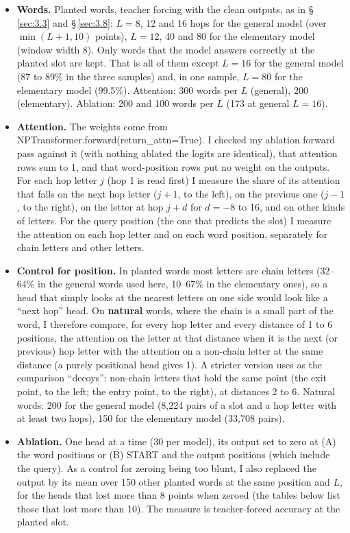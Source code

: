 \documentclass[paper=a4,fontsize=11pt,DIV=11,parskip=half,headings=small,numbers=noendperiod]{scrartcl}
\DeclareRobustCommand{\lead}[1]{\textsf{\bfseries\color{accent}#1}}
\DeclareRobustCommand{\code}[1]{{\fontseries{m}\ttfamily #1}}
\begin{document}
\begin{itemize}
\item \lead{Words.} Planted words, teacher forcing with the clean outputs, as in \S\,\ref{sec:3.3} and
  \S\,\ref{sec:3.8}: $L=8$, 12 and 16 hops for the general model (over $\min(L+1,10)$ points), $L=12$, 40 and 80
  for the elementary model (window width 8). Only words that the model answers correctly at the planted slot are
  kept. That is all of them except $L=16$ for the general model (87 to 89\% in the three samples) and, in one
  sample, $L=80$ for the elementary model (99.5\%). Attention: 300 words per $L$ (general), 200 (elementary).
  Ablation: 200 and 100 words per $L$ (173 at general $L=16$).
\item \lead{Attention.} The weights come from
  \code{NPTransformer.\allowbreak{}forward(return\_\allowbreak{}attn=\allowbreak{}True)}. I checked my ablation
  forward pass against it (with nothing ablated the logits are identical), that attention rows sum to 1, and
  that word-position rows put no weight on the outputs. For each hop letter $j$ (hop 1 is read first) I measure
  the share of its attention that falls on the next hop letter ($j+1$, to the left), on the previous one ($j-1$,
  to the right), on the letter at hop $j+d$ for $d=-8$ to 16, and on other kinds of letters. For the query
  position (the one that predicts the slot) I measure the attention on each hop letter and on each word
  position, separately for chain letters and other letters.
\item \lead{Control for position.} In planted words most letters are chain letters (32–64\% in the general words
  used here, 10–67\% in the elementary ones), so a head that simply looks at the nearest letters on one side
  would look like a “next hop” head. On \textbf{natural} words, where the chain is a small part of the word, I
  therefore compare, for every hop letter and every distance of 1 to 6 positions, the attention on the letter at
  that distance when it is the next (or previous) hop letter with the attention on a non-chain letter at the
  same distance (a purely positional head gives 1). A stricter version uses as the comparison “decoys”:
  non-chain letters that hold the same point (the exit point, to the left; the entry point, to the right), at
  distances 2 to 6. Natural words: 200 for the general model (8,224 pairs of a slot and a hop letter with at
  least two hops), 150 for the elementary model (33,708 pairs).
\item \lead{Ablation.} One head at a time (30 per model), its output set to zero at (A) the word positions or
  (B) START and the output positions (which include the query). As a control for zeroing being too blunt, I also
  replaced the output by its mean over 150 other planted words at the same position and $L$, for the heads that
  lost more than 8 points when zeroed (the tables below list those that lost more than 10). The measure is
  teacher-forced accuracy at the planted slot.
\end{itemize}
\end{document}
